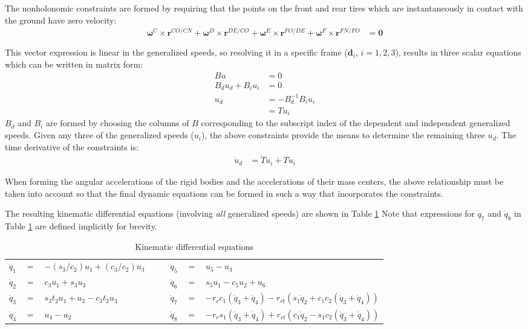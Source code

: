 \documentclass[letterpaper,11pt]{article}
\newcommand{\bs}[1]{ \boldsymbol{ #1 } }
\begin{document}
The nonholonomic constraints are formed by requiring that the
points on the front and rear tires which are instantaneously in contact with
the ground have zero velocity:
\begin{align*}
  \bs{\omega}^C \times \bs{r}^{CO/CN} + \bs{\omega}^D \times \bs{r}^{DE/CO} +
  \bs{\omega}^E \times \bs{r}^{FO/DE} + \bs{\omega}^F \times \bs{r}^{FN/FO} & =
  \bs{0}
\end{align*}

This vector expression is linear in the generalized speeds, so resolving it in
a specific frame ($\bs{d}_i$, $i = 1, 2, 3$), results in three scalar equations
which can be written in matrix form:
\begin{align*}
  B u & = 0 \\
  B_d u_d + B_i u_i & = 0 \\
  u_d & = -B_d^{-1} B_i u_i \\
      & = T u_i
\end{align*}
$B_d$ and $B_i$ are formed by choosing the columns of $B$ corresponding
to the subscript index of the dependent and independent generalized speeds.
Given any three of the generalized speeds ($u_i$), the above constraints provide the
means to determine the remaining three $u_d$.  The time derivative of the
constraints is:
\begin{align*}
  \dot{u}_d & = \dot{T} u_i + T \dot{u}_i
\end{align*}

When forming the angular accelerations of the rigid bodies and the
accelerations of their mass centers, the above relationship must be taken into
account so that the final dynamic equations can be formed in such a way that
incorporates the constraints.


The resulting kinematic differential equations
(involving {\it{all}} generalized speeds) are shown in Table \ref{kindiffs}
Note that expressions for $\dot{q}_7$ and $\dot{q}_8$ in Table \ref{kindiffs}
are defined implicitly for brevity.
\begin{table}[!h]
  \begin{center}
    \begin{tabular}{rclcrcl}
        $\dot{q}_1$ & $=$ & $-(s_3/c_2) u_1 + (c_3/c_2) u_3$ &$\quad$&
        $\dot{q}_5$ & $=$ & $u_5 - u_3$ \\
        $\dot{q}_2$ & $=$ & $c_3 u_1 + s_3 u_3$ &$\quad$&
        $\dot{q}_6$ & $=$ & $s_5 u_1 - c_5 u_2 + u_6$ \\
        $\dot{q}_3$ & $=$ & $s_3 t_2 u_1 + u_2 - c_3 t_2 u_3$ &$\quad$&
        $\dot{q}_7$ & $=$ & $-r_r c_1 (\dot{q}_3 + \dot{q}_4) -
        r_{rt}(s_1 \dot{q}_2 + c_1 c_2 (\dot{q}_3 + \dot{q}_4))$\\
        $\dot{q}_4$ & $=$ & $u_4 - u_2$ & $\quad$ &
        $\dot{q}_8$ & $=$ & $-r_r s_1 (\dot{q}_3 + \dot{q}_4) +
        r_{rt}(c_1 \dot{q}_2 - s_1 c_2 (\dot{q}_3 + \dot{q}_4))$
    \end{tabular}
  \end{center}
  \caption{Kinematic differential equations}
  \label{kindiffs}
\end{table}
\end{document}
